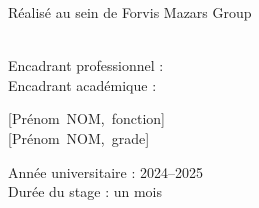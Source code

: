 \begin{titlepage}
{Réalisé au sein de Forvis Mazars Group}\\[0.3cm]
\\

\vskip0.7cm

\begin{flushleft}
\begin{minipage}[c]{0.32\columnwidth}
Encadrant professionnel :\\
Encadrant académique :\\
\end{minipage}
\begin{minipage}[c]{0.62\columnwidth}
\mbox{[Prénom NOM, fonction]}\\
\mbox{[Prénom NOM, grade]}\\
\end{minipage}
\end{flushleft}

\vfill
{\large Année universitaire : 2024--2025}\\[0.3cm]
{\large Durée du stage : un mois}

\end{titlepage}